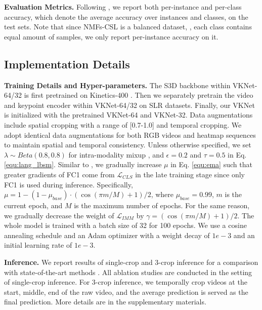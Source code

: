 \documentclass[10pt,twocolumn,letterpaper]{article}
\def \tbf{\textbf}
\begin{document}
\noindent\tbf{Evaluation Metrics.}
Following \cite{hu2021signbert, hu2021hand, jiang2021sign}, we report both per-instance and per-class accuracy, which denote the average accuracy over instances and classes, on the test sets. Note that since NMFs-CSL is a balanced dataset, \ie, each class contains equal amount of samples, we only report per-instance accuracy on it.


\subsection{Implementation Details}
\noindent\tbf{Training Details and Hyper-parameters.}
The S3D backbone within VKNet-64/32 is first pretrained on Kinetics-400 \cite{kay2017kinetics}.
Then we separately pretrain the video and keypoint encoder within VKNet-64/32 on SLR datasets.
Finally, our VKNet is initialized with the pretrained VKNet-64 and VKNet-32.
Data augmentations include spatial cropping with a range of [0.7-1.0] and temporal cropping.
We adopt identical data augmentations for both RGB videos and heatmap sequences to maintain spatial and temporal consistency.
Unless otherwise specified, we set $\lambda \sim Beta(0.8, 0.8)$ for intra-modality mixup \cite{zhang2018mixup}, and $\epsilon=0.2$ and $\tau=0.5$ in Eq. \ref{equ:lang_lbsm}.
Similar to \cite{grill2020bootstrap}, we gradually increase $\mu$ in Eq. \ref{equ:ema} such that greater gradients of FC1 come from $\mathcal{L}_{CLS}$ in the late training stage since only FC1 is used during inference.
Specifically, $\mu=1-(1-\mu_{base})\cdot(\cos{(\pi m/M)}+1)/2$, where $\mu_{base}=0.99$, $m$ is the current epoch, and $M$ is the maximum number of epochs.
For the same reason, we gradually decrease the weight of $\mathcal{L}_{IMM}$ by $\gamma=(\cos{(\pi m/M)}+1)/2$.
The whole model is trained with a batch size of 32 for 100 epochs.
We use a cosine annealing schedule and an Adam optimizer \cite{adam} with a weight decay of $1e-3$ and an initial learning rate of $1e-3$.


\noindent\tbf{Inference.}
We report results of single-crop and 3-crop inference for a comparison with state-of-the-art methods \cite{albanie2020bsl, jiang2021skeleton, jiang2021sign}. All ablation studies are conducted in the setting of single-crop inference. For 3-crop inference, we temporally crop videos at the start, middle, end of the raw video, and the average prediction is served as the final prediction.
More details are in the supplementary materials.
\end{document}
